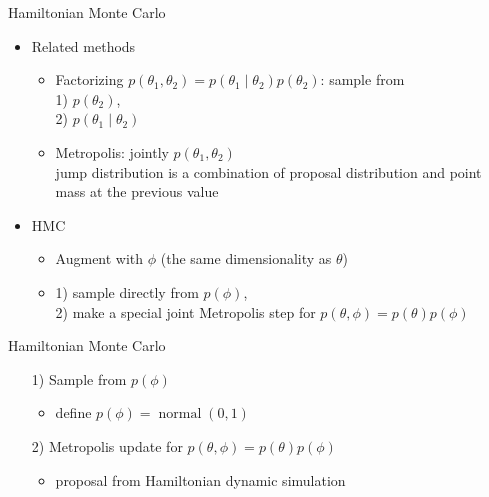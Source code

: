 \documentclass[finnish,english,t]{beamer}
\DeclareMathOperator{\normal}{normal}
\begin{document}
\begin{frame}{Hamiltonian Monte Carlo}

  \begin{itemize}
  \item Related methods
    \begin{itemize}
    \item<+-> Factorizing $p(\theta_1,\theta_2)=p(\theta_1 \mid \theta_2)p(\theta_2)$: sample from\\
      1) $p(\theta_2)$,\\
      2) $p(\theta_1 \mid \theta_2)$
    \item<+-> Metropolis: jointly $p(\theta_1,\theta_2)$\\
      jump distribution is a combination of proposal distribution and
      point mass at the previous value
    \end{itemize}
  \item<+-> HMC
    \begin{itemize}
    \item Augment with $\phi$ (the same dimensionality as $\theta$)
    \item 1) sample directly from $p(\phi)$,\\
      2) make a special joint Metropolis step for $p(\theta,\phi)=p(\theta)p(\phi)$
    \end{itemize}
  \end{itemize}
  
\end{frame}

\begin{frame}{Hamiltonian Monte Carlo}

  \begin{itemize}
  \item[1)] Sample from $p(\phi)$
    \begin{itemize}
    \item define $p(\phi) = \normal(0,1)$
    \end{itemize}
  \item[2)] Metropolis update for $p(\theta,\phi)=p(\theta)p(\phi)$
    \begin{itemize}
    \item proposal from Hamiltonian dynamic simulation
    \end{itemize}
  
  \end{itemize}
  
\end{frame}
\end{document}
